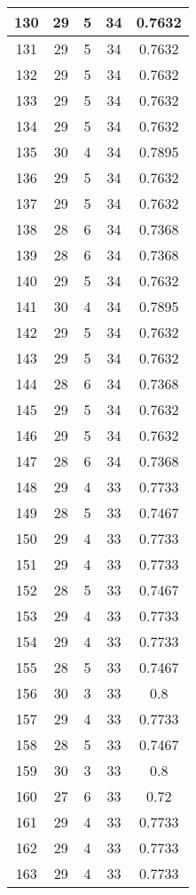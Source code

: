 \documentclass[letterpaper, 12pt]{article}
\begin{document}
\begin{longtable}{|c|c|c|c|c|}
\hline
130 & 29 & 5 & 34 & 0.7632 \\
\hline
131 & 29 & 5 & 34 & 0.7632 \\
\hline
132 & 29 & 5 & 34 & 0.7632 \\
\hline
133 & 29 & 5 & 34 & 0.7632 \\
\hline
134 & 29 & 5 & 34 & 0.7632 \\
\hline
135 & 30 & 4 & 34 & 0.7895 \\
\hline
136 & 29 & 5 & 34 & 0.7632 \\
\hline
137 & 29 & 5 & 34 & 0.7632 \\
\hline
138 & 28 & 6 & 34 & 0.7368 \\
\hline
139 & 28 & 6 & 34 & 0.7368 \\
\hline
140 & 29 & 5 & 34 & 0.7632 \\
\hline
141 & 30 & 4 & 34 & 0.7895 \\
\hline
142 & 29 & 5 & 34 & 0.7632 \\
\hline
143 & 29 & 5 & 34 & 0.7632 \\
\hline
144 & 28 & 6 & 34 & 0.7368 \\
\hline
145 & 29 & 5 & 34 & 0.7632 \\
\hline
146 & 29 & 5 & 34 & 0.7632 \\
\hline
147 & 28 & 6 & 34 & 0.7368 \\
\hline
148 & 29 & 4 & 33 & 0.7733 \\
\hline
149 & 28 & 5 & 33 & 0.7467 \\
\hline
150 & 29 & 4 & 33 & 0.7733 \\
\hline
151 & 29 & 4 & 33 & 0.7733 \\
\hline
152 & 28 & 5 & 33 & 0.7467 \\
\hline
153 & 29 & 4 & 33 & 0.7733 \\
\hline
154 & 29 & 4 & 33 & 0.7733 \\
\hline
155 & 28 & 5 & 33 & 0.7467 \\
\hline
156 & 30 & 3 & 33 & 0.8 \\
\hline
157 & 29 & 4 & 33 & 0.7733 \\
\hline
158 & 28 & 5 & 33 & 0.7467 \\
\hline
159 & 30 & 3 & 33 & 0.8 \\
\hline
160 & 27 & 6 & 33 & 0.72 \\
\hline
161 & 29 & 4 & 33 & 0.7733 \\
\hline
162 & 29 & 4 & 33 & 0.7733 \\
\hline
163 & 29 & 4 & 33 & 0.7733 \\

\end{longtable}
\end{document}
